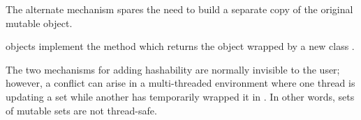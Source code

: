 The alternate mechanism spares the need to build a separate copy of
the original mutable object.

 objects implement the 
method which returns the  object wrapped by a new class
.

The two mechanisms for adding hashability are normally invisible to the
user; however, a conflict can arise in a multi-threaded environment
where one thread is updating a set while another has temporarily wrapped it
in .  In other words, sets of mutable sets
are not thread-safe.

